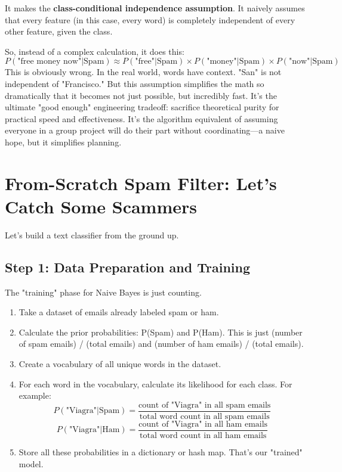 \documentclass[11pt, letterpaper, openany]{book}
\begin{document}
It makes the \textbf{class-conditional independence assumption}. It naively assumes that every feature (in this case, every word) is completely independent of every other feature, given the class.

So, instead of a complex calculation, it does this:
\[ P(\text{"free money now"}|\text{Spam}) \approx P(\text{"free"}|\text{Spam}) \times P(\text{"money"}|\text{Spam}) \times P(\text{"now"}|\text{Spam}) \]
This is obviously wrong. In the real world, words have context. "San" is not independent of "Francisco." But this assumption simplifies the math so dramatically that it becomes not just possible, but incredibly fast. It's the ultimate "good enough" engineering tradeoff: sacrifice theoretical purity for practical speed and effectiveness. It's the algorithm equivalent of assuming everyone in a group project will do their part without coordinating—a naive hope, but it simplifies planning.

\section{From-Scratch Spam Filter: Let's Catch Some Scammers}

Let's build a text classifier from the ground up.

\subsection{Step 1: Data Preparation and Training}

The "training" phase for Naive Bayes is just counting.
\begin{enumerate}
    \item Take a dataset of emails already labeled spam or ham.
    \item Calculate the prior probabilities: P(Spam) and P(Ham). This is just (number of spam emails) / (total emails) and (number of ham emails) / (total emails).
    \item Create a vocabulary of all unique words in the dataset.
    \item For each word in the vocabulary, calculate its likelihood for each class. For example:
    \[ P(\text{"Viagra"}|\text{Spam}) = \frac{\text{count of "Viagra" in all spam emails}}{\text{total word count in all spam emails}} \]
    \[ P(\text{"Viagra"}|\text{Ham}) = \frac{\text{count of "Viagra" in all ham emails}}{\text{total word count in all ham emails}} \]
    \item Store all these probabilities in a dictionary or hash map. That's our "trained" model.
\end{enumerate}
\end{document}
